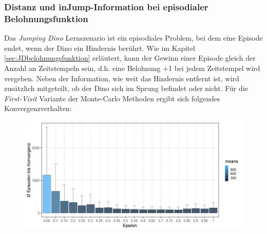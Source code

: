 \subsubsection*{Distanz und \glqq inJump\grqq{}-Information bei episodialer Belohnungsfunktion}
Das \textit{Jumping Dino} Lernszenario ist ein episodiales Problem, bei dem eine Episode endet, wenn der Dino ein Hindernis berührt. Wie im Kapitel \ref{sec:JDbelohnungsfunktion} erläutert, kann der Gewinn einer Episode gleich der Anzahl an Zeitstempeln sein, d.h. eine Belohnung +1 bei jedem Zeitstempel wird vergeben. Neben der Information, wie weit das Hindernis entfernt ist, wird zusätzlich mitgeteilt, ob der Dino sich im Sprung befindet oder nicht. Für die \textit{First-Visit} Variante der Monte-Carlo Methoden ergibt sich folgendes Konvergenzverhalten:

\begin{figure}[H]
    \centering
    \includegraphics[width=\textwidth]{images/SimpleZ2B1MonteCarloA}
    \label{fig:test1}
\end{figure}

